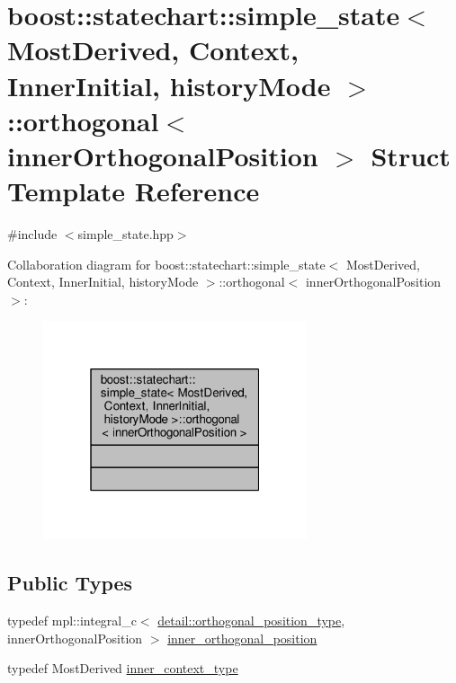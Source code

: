 \hypertarget{structboost_1_1statechart_1_1simple__state_1_1orthogonal}{}\section{boost\+:\+:statechart\+:\+:simple\+\_\+state$<$ Most\+Derived, Context, Inner\+Initial, history\+Mode $>$\+:\+:orthogonal$<$ inner\+Orthogonal\+Position $>$ Struct Template Reference}
\label{structboost_1_1statechart_1_1simple__state_1_1orthogonal}


{\ttfamily \#include $<$simple\+\_\+state.\+hpp$>$}



Collaboration diagram for boost\+:\+:statechart\+:\+:simple\+\_\+state$<$ Most\+Derived, Context, Inner\+Initial, history\+Mode $>$\+:\+:orthogonal$<$ inner\+Orthogonal\+Position $>$\+:
\nopagebreak
\begin{figure}[H]
\begin{center}
\leavevmode
\includegraphics[width=220pt]{structboost_1_1statechart_1_1simple__state_1_1orthogonal__coll__graph}
\end{center}
\end{figure}
\subsection*{Public Types}
\begin{DoxyCompactItemize}
\item 
typedef mpl\+::integral\+\_\+c$<$ \mbox{\hyperlink{namespaceboost_1_1statechart_1_1detail_a3bedea0b807a16fa222733417183d2c9}{detail\+::orthogonal\+\_\+position\+\_\+type}}, inner\+Orthogonal\+Position $>$ \mbox{\hyperlink{structboost_1_1statechart_1_1simple__state_1_1orthogonal_aac234f0598846fe09031205a35a774c3}{inner\+\_\+orthogonal\+\_\+position}}
\item 
typedef Most\+Derived \mbox{\hyperlink{structboost_1_1statechart_1_1simple__state_1_1orthogonal_a3554165273725dee5399f859fea59613}{inner\+\_\+context\+\_\+type}}
\end{DoxyCompactItemize}


